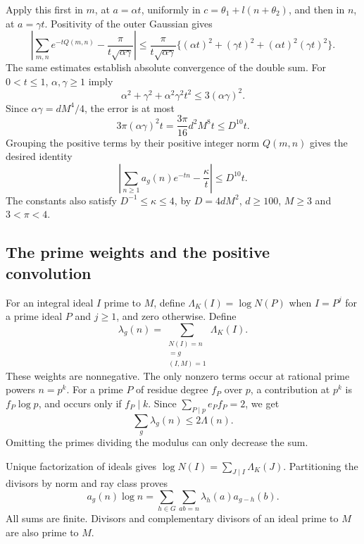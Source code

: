Apply this first in \(m\), at \(a=\alpha t\), uniformly in
\(c=\theta_1+l(n+\theta_2)\), and then in \(n\), at
\(a=\gamma t\). Positivity of the outer Gaussian gives
\[
 \left|\sum_{m,n}e^{-tQ(m,n)}
                      -\frac{\pi}{t\sqrt{\alpha\gamma}}\right|
 \leq\frac{\pi}{t\sqrt{\alpha\gamma}}
        \{(\alpha t)^2+(\gamma t)^2+(\alpha t)^2(\gamma t)^2\}.
\]
The same estimates establish absolute convergence of the double
sum. For \(0<t\leq1\), \(\alpha,\gamma\geq1\) imply
\[
 \alpha^2+\gamma^2+\alpha^2\gamma^2t^2
                                     \leq3(\alpha\gamma)^2.
\]
Since \(\alpha\gamma=dM^4/4\), the error is at most
\[
        3\pi(\alpha\gamma)^2t
             =\frac{3\pi}{16}d^2M^8t\leq D^{10}t .
\]
Grouping the positive terms by their positive integer norm
\(Q(m,n)\) gives the desired identity
\begin{equation}
 \label{eq:ray-theta-done}
       \left|\sum_{n\geq1}a_g(n)e^{-tn}-\frac{\kappa}{t}\right|
                                  \leq D^{10}t .
\end{equation}
The constants also satisfy
\(D^{-1}\leq\kappa\leq4\), by \(D=4dM^2\), \(d\geq100\),
\(M\geq3\) and \(3<\pi<4\).

\subsection{The prime weights and the positive convolution}

For an integral ideal \(I\) prime to \(M\), define
\(\Lambda_K(I)=\log N(P)\) when \(I=P^j\) for a prime ideal \(P\)
and \(j\geq1\), and zero otherwise. Define
\[
       \lambda_g(n)=
        \sum_{\substack{N(I)=n\\ [I]=g\\(I,M)=1}}\Lambda_K(I).
\]
These weights are nonnegative. The only nonzero terms occur at
rational prime powers \(n=p^k\).
For a prime \(P\) of residue degree \(f_P\) over \(p\), a contribution
at \(p^k\) is \(f_P\log p\), and occurs only if \(f_P\mid k\).
Since \(\sum_{P\mid p}e_Pf_P=2\), we get
\begin{equation}
 \label{eq:ray-lambda-budget}
                         \sum_g\lambda_g(n)\leq2\Lambda(n).
\end{equation}
Omitting the primes dividing the modulus can only decrease the sum.

Unique factorization of ideals gives
\(\log N(I)=\sum_{J\mid I}\Lambda_K(J)\).
Partitioning the divisors by norm and ray class proves
\[
 a_g(n)\log n
       =\sum_{h\in G}\sum_{ab=n}\lambda_h(a)a_{g-h}(b).
\]
All sums are finite. Divisors and complementary divisors of an ideal
prime to \(M\) are also prime to \(M\).

